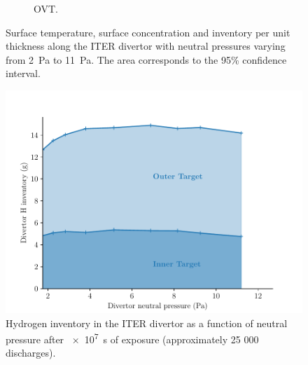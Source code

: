 \begin{figure}[h!]
\begin{subfigure}{0.58\linewidth}
        \caption{OVT.}
    \end{subfigure}
    \caption{Surface temperature, surface concentration and inventory per unit thickness along the ITER divertor with neutral pressures varying from \SI{2}{Pa} to \SI{11}{Pa}. The area corresponds to the 95\% confidence interval.}
\end{figure}


\begin{figure}[h]
    \centering
    \includegraphics[width=\linewidth]{Figures/Chapter4/ITER/inventory_vs_divertor_pressure.pdf}
    \caption{Hydrogen inventory in the ITER divertor as a function of neutral pressure after \SI{e7}{s} of exposure (approximately 25 000 discharges).}
\end{figure}


